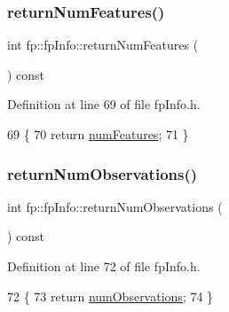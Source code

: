 \subsubsection{\texorpdfstring{return\+Num\+Features()}{returnNumFeatures()}}
{\footnotesize\ttfamily int fp\+::fp\+Info\+::return\+Num\+Features (\begin{DoxyParamCaption}{ }\end{DoxyParamCaption}) const\hspace{0.3cm}{\ttfamily [inline]}}



Definition at line 69 of file fp\+Info.\+h.


\begin{DoxyCode}
69                                                 \{
70                 \textcolor{keywordflow}{return} \hyperlink{classfp_1_1fpInfo_a6ed8deabebae772fc213730cd29a2e61}{numFeatures};
71             \}
\end{DoxyCode}
\mbox{\label{classfp_1_1fpInfo_a8e340d343bc946ffd6be09a001e3e5dd}} 
\subsubsection{\texorpdfstring{return\+Num\+Observations()}{returnNumObservations()}}
{\footnotesize\ttfamily int fp\+::fp\+Info\+::return\+Num\+Observations (\begin{DoxyParamCaption}{ }\end{DoxyParamCaption}) const\hspace{0.3cm}{\ttfamily [inline]}}



Definition at line 72 of file fp\+Info.\+h.


\begin{DoxyCode}
72                                                     \{
73                 \textcolor{keywordflow}{return} \hyperlink{classfp_1_1fpInfo_a1b35cd17d4ddb35e232246a6549d7a74}{numObservations};
74             \}
\end{DoxyCode}
\mbox{\label{classfp_1_1fpInfo_a7711d632e8718a60070594e9c731599a}} 
